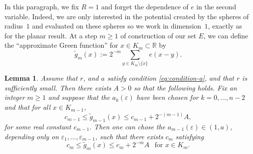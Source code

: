 \documentclass[10pt]{amsart}
\let\sm\setminus
\let\wt\widetilde
\numberwithin{equation}{section}
\theoremstyle{plain}
\newtheorem{lem}{Lemma}[section]
\theoremstyle{definition}
\newcommand{\R}{\mathbb{R}}
\begin{document}
In this paragraph, we fix $R=1$ and forget the dependence of $e$ in the second variable. Indeed, we are only interested in the potential created by the spheres of radius~$1$ and evaluated on these spheres so we work in dimension~$1$, exactly as for the planar result.
At a step $m \ge 1$ of construction of our set $E$, we can define the ``approximate Green
function'' for $x\in K_m\subset \R$ by %
\begin{equation*}
\wt g _m(x):= 2^{-m} \sum_{y\in K_m\sm \{x\}} e(x-y).
\end{equation*}
\begin{lem}\label{mainLemma2}
Assume that $r$, and $a$ satisfy condition \eqref{eq:condition-a}, and that $r$ is sufficiently small. Then there exists $A >0$ so that the following holds.
Fix an integer $m\ge 1$ and suppose that the $a_k(\varepsilon)$ have been chosen for $k= 0,\dots, n-2$
and that for all $x \in K_{m-1}$,
\begin{equation}\label{eq:2iter-step-n-1}
c_{m-1} \le \wt g_{m-1}(x) \le c_{m-1} + 2^{-(m-1)} A,
\end{equation}
for some real constant $c_{m-1}$. Then one can chose the $a_{m-1}(\varepsilon)\in (1,a)$,
depending only on $\varepsilon_1, \dotsc, \varepsilon_{m-1}$,
such that there exists $c_m$
satisfying
\begin{equation}\label{eq:2iter-step-n}
c_m \le \wt g_m (x) \le c_m + 2^{-m} A
\ \ \text{ for $x\in K_m$.}
\end{equation}
\end{lem}
\end{document}
